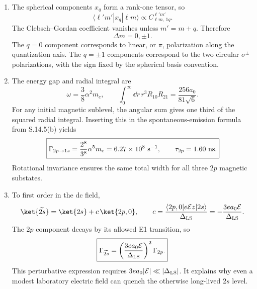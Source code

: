 \begin{enumerate}
\begin{enumerate}
\item
The spherical components \(x_q\) form a rank-one tensor, so
\[
 \langle\ell'm'|x_q|\ell m\rangle
 \propto C^{\ell'm'}_{\ell m,\,1q}.
\]
The Clebsch--Gordan coefficient vanishes unless \(m'=m+q\).  Therefore
\[
 \boxed{\Delta m=0,\pm1.}
\]
The \(q=0\) component corresponds to linear, or \(\pi\), polarization along
the quantization axis.  The \(q=\pm1\) components correspond to the two
circular \(\sigma^\pm\) polarizations, with the sign fixed by the spherical
basis convention.
\item
The energy gap and radial integral are
\[
 \omega=\frac{3}{8}\alpha^2m_e,\qquad
 \int_0^\infty \dd r\,r^3R_{10}R_{21}
 =\frac{256a_0}{81\sqrt6}.
\]
For any initial magnetic sublevel, the angular sum gives one third of the
squared radial integral.  Inserting this in the spontaneous-emission
formula from S.14.5(b) yields
\[
 \boxed{\Gamma_{2p\to1s}
 =\frac{2^8}{3^8}\alpha^5m_e
 =6.27\times10^8\ {\rm s}^{-1},\qquad
 \tau_{2p}=1.60\ {\rm ns}.}
\]
Rotational invariance ensures the same total width for all three \(2p\)
magnetic substates.
\item
To first order in the dc field,
\[
 \ket{\widetilde{2s}}
 =\ket{2s}+c\,\ket{2p,0},\qquad
 c=\frac{\langle2p,0|e\mathcal Ez|2s\rangle}{\Delta_{\rm LS}}
 =-\frac{3ea_0\mathcal E}{\Delta_{\rm LS}}.
\]
The \(2p\) component decays by its allowed E1 transition, so
\[
 \boxed{\Gamma_{\widetilde{2s}}
 =\left(\frac{3ea_0\mathcal E}{\Delta_{\rm LS}}\right)^2
 \Gamma_{2p}.}
\]
This perturbative expression requires
\(3ea_0|\mathcal E|\ll|\Delta_{\rm LS}|\).  It explains why even a modest
laboratory electric field can quench the otherwise long-lived \(2s\) level.
\end{enumerate}


\end{enumerate}
